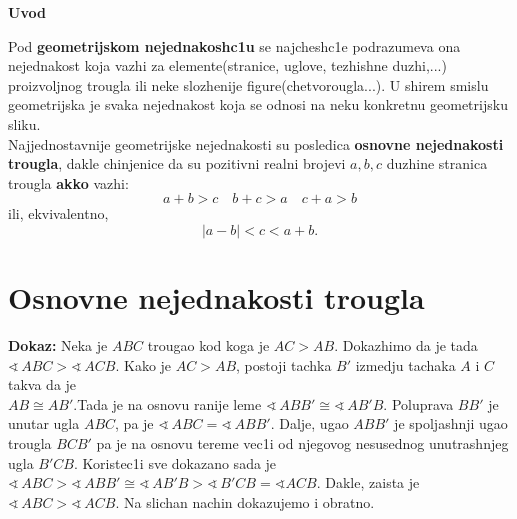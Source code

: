 \documentclass[11pt,letter]{report}
\def\ug{\mathbin{\sphericalangle\,}}
\begin{document}
\newpage
\begin{large}
\vspace*{-1.5in}
\begin{center}
\vspace{0.2in}
\huge \textbf{Uvod}
\end{center}
\vspace{0.2in}
\begin{flushleft}
 Pod \textbf{geometrijskom nejednakosh{}c1u} se najchesh{}c1e podrazumeva ona nejednakost koja vazhi za elemente(stranice, uglove, tezhishne duzhi,...) proizvoljnog trougla ili neke slozhenije figure(chetvorougla...). U shirem smislu geometrijska je svaka nejednakost koja se odnosi na neku konkretnu geometrijsku sliku.\\

Najjednostavnije geometrijske nejednakosti su posledica \textbf{osnovne nejednakosti trougla}, dakle chinjenice da su pozitivni realni brojevi $a,b,c$ duzhine stranica trougla \textbf{akko} vazhi:$$a+b>c \quad b+c>a\quad c+a>b$$
ili, ekvivalentno, $$|a-b|<c<a+b.$$
\section*{\centering \LARGE Osnovne nejednakosti trougla}
\begin{frame}{}
\end{frame}

\vspace{0.1in}
\textbf{Dokaz:} Neka je $ABC$ trougao kod koga je $AC>AB$. Dokazhimo da je tada\\
$\ug ABC > \ug ACB$. Kako je $AC>AB$, postoji tachka $B'$ izmedju tachaka $A$ i $C$ takva da je \\$AB\cong AB'$.Tada je na osnovu ranije leme $\ug ABB'\cong \ug AB'B$. Poluprava $BB'$ je unutar ugla $ABC$, pa je $\ug ABC =\ug ABB'$. Dalje, ugao $ABB'$ je spoljashnji ugao trougla $BCB'$ pa je na osnovu tereme vec1i od njegovog nesusednog unutrashnjeg ugla $B'CB$. Koristec1i sve dokazano sada je $\ug ABC>\ug ABB' \cong \ug AB'B>\ug B'CB=\sphericalangle ACB.$ Dakle, zaista je $ \ug ABC>\ug ACB$. Na slichan nachin dokazujemo i obratno.\\
\vspace{0.5cm}


\end{flushleft}
\end{large}
\end{document}

